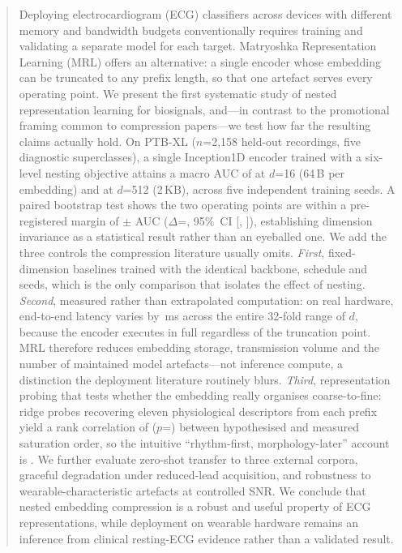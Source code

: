 \begin{abstract}
Deploying electrocardiogram (ECG) classifiers across devices with different
memory and bandwidth budgets conventionally requires training and validating a
separate model for each target. Matryoshka Representation Learning (MRL)
offers an alternative: a single encoder whose embedding can be truncated to any
prefix length, so that one artefact serves every operating point. We present
the first systematic study of nested representation learning for biosignals,
and---in contrast to the promotional framing common to compression
papers---we test how far the resulting claims actually hold.
%
On PTB-XL ($n$=2{,}158 held-out recordings, five diagnostic superclasses), a
single Inception1D encoder trained with a six-level nesting objective attains a
macro AUC of  at $d$=16 (64\,B per embedding) and
 at $d$=512 (2\,KB), across five independent training seeds. A
paired bootstrap test shows the two operating points are 
within a pre-registered margin of $\pm$ AUC
($\Delta$=, 95\%~CI [, ]), establishing
dimension invariance as a statistical result rather than an eyeballed one.
%
We add the three controls the compression literature usually omits.
\emph{First}, fixed-dimension baselines trained with the identical backbone,
schedule and seeds, which is the only comparison that isolates the effect of
nesting. \emph{Second}, measured rather than extrapolated computation: on real
hardware, end-to-end latency varies by \,ms across the entire
32-fold range of $d$, because the encoder executes in full regardless of the
truncation point. MRL therefore reduces embedding storage, transmission
volume and the number of maintained model artefacts---not inference compute,
a distinction the deployment literature routinely blurs. \emph{Third},
representation probing that tests whether the embedding really organises
coarse-to-fine: ridge probes recovering eleven physiological descriptors from
each prefix yield a rank correlation of  ($p$=) between
hypothesised and measured saturation order, so the intuitive
``rhythm-first, morphology-later'' account is .
%
We further evaluate zero-shot transfer to three external corpora, graceful
degradation under reduced-lead acquisition, and robustness to
wearable-characteristic artefacts at controlled SNR. We conclude that nested
embedding compression is a robust and useful property of ECG representations,
while deployment on wearable hardware remains an inference from clinical
resting-ECG evidence rather than a validated result.
\end{abstract}
